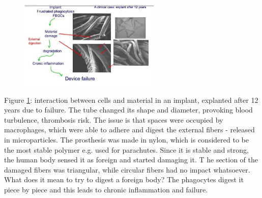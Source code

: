 \begin{figure}[ht]
\centering
\includegraphics[width=0.6\textwidth]{failure}
\caption{\label{fig:failure}}
\end{figure}
\noindent
Figure \ref{fig:failure}: interaction between cells and material in an implant, explanted after 12 years due to failure.  
The tube changed its shape and diameter, provoking blood turbulence, thrombosis risk. 
The issue is that spaces were occupied by macrophages, which were able to adhere and digest the external fibers - released in microparticles. 
The prosthesis was made in nylon, which is considered to be the most stable polymer e.g. used for parachutes. 
Since it is stable and strong, the human body sensed it as foreign and started damaging it. T
he section of the damaged fibers was triangular, while circular fibers had no impact whatsoever. 
What does it mean to try to digest a foreign body? The phagocytes digest it piece by piece and this leads to chronic inflammation and failure.

